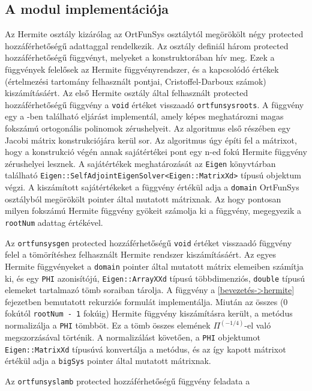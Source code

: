 \documentclass[oneside,titlepage,12pt,a4paper]{report}
\begin{document}
\subsection*{A modul implementációja}

\par Az Hermite osztály kizárólag az OrtFunSys osztálytól megörökölt négy protected hozzáférhetőségű adattaggal rendelkezik. 
Az osztály definiál három protected hozzáférhetőségű függvényt, melyeket a konstruktorában hív meg. Ezek a függvények felelősek az Hermite függvényrendszer, és a kapcsolódó értékek (értelmezési tartomány felhasznált pontjai, Cristoffel-Darboux számok) kiszámításáért. 
Az első Hermite osztály által felhasznált protected hozzáférhetőségű függvény a \texttt{void} értéket visszaadó \texttt{ortfunsysroots}.
A függvény egy a \cite{Gautschi}-ben található eljárást implementál, amely képes meghatározni magas fokszámú ortogonális polinomok zérushelyeit. Az algoritmus első részében egy Jacobi mátrix konstrukciójára kerül sor. Az algoritmus úgy építi fel a mátrixot, hogy a konstrukció végén annak sajátértékei pont egy n-ed fokú Hermite függvény zérushelyei lesznek. A sajátértékek meghatározását az \texttt{Eigen} könyvtárban található \texttt{Eigen::SelfAdjointEigenSolver<Eigen::MatrixXd>} típusú objektum végzi. A kiszámított sajátértékeket a függvény értékül adja a \texttt{domain} OrtFunSys osztályból megörökölt pointer által mutatott mátrixnak. Az hogy pontosan milyen fokszámú Hermite függvény gyökeit számolja ki a függvény, megegyezik a \texttt{rootNum} adattag értékével.   
\par Az \texttt{ortfunsysgen} protected hozzáférhetőségű \texttt{void} értéket visszaadó függvény felel a tömörítéshez felhasznált Hermite rendszer kiszámításáért. Az egyes Hermite függvényeket a \texttt{domain} pointer által mutatott mátrix elemeiben számítja ki, és egy \texttt{PHI} azonisítójú, \texttt{Eigen::ArrayXXd} típusú többdimenziós, \texttt{double} típusú elemeket tartalmazó tömb soraiban tárolja. A függvény a \ref{bevezetés->hermite} fejezetben bemutatott rekurziós formulát implementálja. Miután az összes (0 fokútól \texttt{rootNum - 1} fokúig) Hermite függvény kiszámításra került, a metódus normalizálja a \texttt{PHI} tömbböt. Ez a tömb összes elemének $\Pi^{(-1/4)}$-el való megszorzásával történik. A normalizálást követően, a \texttt{PHI} objektumot \texttt{Eigen::MatrixXd} típusúvá konvertálja a metódus, és az így kapott mátrixot értékül adja a \texttt{bigSys} pointer által mutatott mátrixnak.
\par Az \texttt{ortfunsyslamb} protected hozzáférhetőségű függvény feladata a
\end{document}
